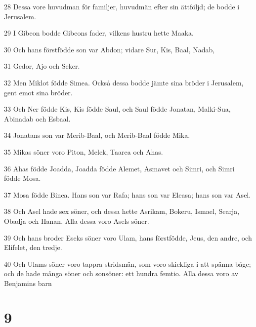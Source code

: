\par 28 Dessa vore huvudman för familjer, huvudmän efter sin ättföljd; de bodde i Jerusalem.
\par 29 I Gibeon bodde Gibeons fader, vilkens hustru hette Maaka.
\par 30 Och hans förstfödde son var Abdon; vidare Sur, Kis, Baal, Nadab,
\par 31 Gedor, Ajo och Seker.
\par 32 Men Miklot födde Simea. Också dessa bodde jämte sina bröder i Jerusalem, gent emot sina bröder.
\par 33 Och Ner födde Kis, Kis födde Saul, och Saul födde Jonatan, Malki-Sua, Abinadab och Esbaal.
\par 34 Jonatans son var Merib-Baal, och Merib-Baal födde Mika.
\par 35 Mikas söner voro Piton, Melek, Taarea och Ahas.
\par 36 Ahas födde Joadda, Joadda födde Alemet, Asmavet och Simri, och Simri födde Mosa.
\par 37 Mosa födde Binea. Hans son var Rafa; hans son var Eleasa; hans son var Asel.
\par 38 Och Asel hade sex söner, och dessa hette Asrikam, Bokeru, Ismael, Searja, Obadja och Hanan. Alla dessa voro Asels söner.
\par 39 Och hans broder Eseks söner voro Ulam, hans förstfödde, Jeus, den andre, och Elifelet, den tredje.
\par 40 Och Ulams söner voro tappra stridsmän, som voro skickliga i att spänna båge; och de hade många söner och sonsöner: ett hundra femtio. Alla dessa voro av Benjamins barn

\chapter{9}

